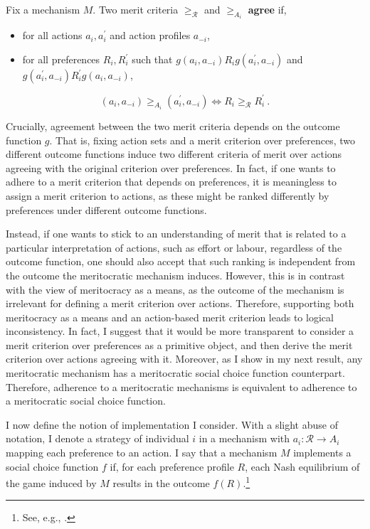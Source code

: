 \begin{definition}
	Fix a mechanism \( M \). Two merit criteria \( \geq_{\mathcal{R}} \) and \( \geq_{A_i} \) \textbf{agree} if,
	\begin{itemize}
		\item for all actions \( a_i, a^{\prime}_{i} \) and action profiles \( a_{-i} \),
		\item for all preferences \( R_i, R^{\prime}_i \) such that \( g ( a_{i}, a_{-i} ) R_i g ( a^{\prime}_{i}, a_{-i} ) \) and \( g ( a^{\prime}_{i}, a_{-i} ) R^{\prime}_i g ( a_{i}, a_{-i} ) \),
	\end{itemize}

	\[ ( a_i, a_{-i} ) \geq_{A_i} ( a^{\prime}_i, a_{-i} ) \iff R_i \geq_{\mathcal{R}} R^{\prime}_i \: . \]
\end{definition}

Crucially, agreement between the two merit criteria depends on the outcome function \( g \). That is, fixing action sets and a merit criterion over preferences, two different outcome functions induce two different criteria of merit over actions agreeing with the original criterion over preferences. In fact, if one wants to adhere to a merit criterion that depends on preferences, it is meaningless to assign a merit criterion to actions, as these might be ranked differently by preferences under different outcome functions.

Instead, if one wants to stick to an understanding of merit that is related to a particular interpretation of actions, such as effort or labour, regardless of the outcome function, one should also accept that such ranking is independent from the outcome the meritocratic mechanism induces. However, this is in contrast with the view of meritocracy as a means, as the outcome of the mechanism is irrelevant for defining a merit criterion over actions. Therefore, supporting both meritocracy as a means and an action-based merit criterion leads to logical inconsistency. In fact, I suggest that it would be more transparent to consider a merit criterion over preferences as a primitive object, and then derive the merit criterion over actions agreeing with it. Moreover, as I show in my next result, any meritocratic mechanism has a meritocratic social choice function counterpart. Therefore, adherence to a meritocratic mechanisms is equivalent to adherence to a meritocratic social choice function.

I now define the notion of implementation I consider. With a slight abuse of notation, I denote a strategy of individual \( i \) in a mechanism with \( a_{i} \colon \mathcal{R} \rightarrow A_i \) mapping each preference to an action. I say that a mechanism \( M \) implements a social choice function \( f \) if, for each preference profile \( R \), each Nash equilibrium of the game induced by \( M \) results in the outcome \( f ( R ) \).\footnote{See, e.g., \citet[p. 913]{mas-colellMicroeconomicTheory1995}.}

